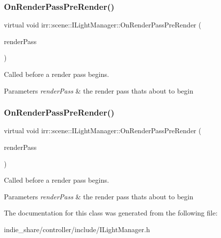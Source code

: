 \subsubsection{\texorpdfstring{On\+Render\+Pass\+Pre\+Render()}{OnRenderPassPreRender()}\hspace{0.1cm}{\footnotesize\ttfamily [1/2]}}
{\footnotesize\ttfamily virtual void irr\+::scene\+::\+I\+Light\+Manager\+::\+On\+Render\+Pass\+Pre\+Render (\begin{DoxyParamCaption}\item[{\hyperlink{namespaceirr_1_1scene_a7862269bd1abc123929d4dbb8200d67f}{E\+\_\+\+S\+C\+E\+N\+E\+\_\+\+N\+O\+D\+E\+\_\+\+R\+E\+N\+D\+E\+R\+\_\+\+P\+A\+SS}}]{render\+Pass }\end{DoxyParamCaption})\hspace{0.3cm}{\ttfamily [pure virtual]}}



Called before a render pass begins. 


\begin{DoxyParams}{Parameters}
{\em render\+Pass} & the render pass that\textquotesingle{}s about to begin \\
\hline
\end{DoxyParams}
\mbox{\label{classirr_1_1scene_1_1ILightManager_a56eaec6a697659f40b4f29b681fbdfad}} 
\subsubsection{\texorpdfstring{On\+Render\+Pass\+Pre\+Render()}{OnRenderPassPreRender()}\hspace{0.1cm}{\footnotesize\ttfamily [2/2]}}
{\footnotesize\ttfamily virtual void irr\+::scene\+::\+I\+Light\+Manager\+::\+On\+Render\+Pass\+Pre\+Render (\begin{DoxyParamCaption}\item[{\hyperlink{namespaceirr_1_1scene_a7862269bd1abc123929d4dbb8200d67f}{E\+\_\+\+S\+C\+E\+N\+E\+\_\+\+N\+O\+D\+E\+\_\+\+R\+E\+N\+D\+E\+R\+\_\+\+P\+A\+SS}}]{render\+Pass }\end{DoxyParamCaption})\hspace{0.3cm}{\ttfamily [pure virtual]}}



Called before a render pass begins. 


\begin{DoxyParams}{Parameters}
{\em render\+Pass} & the render pass that\textquotesingle{}s about to begin \\
\hline
\end{DoxyParams}


The documentation for this class was generated from the following file\+:\begin{DoxyCompactItemize}
\item 
indie\+\_\+share/controller/include/I\+Light\+Manager.\+h\end{DoxyCompactItemize}
